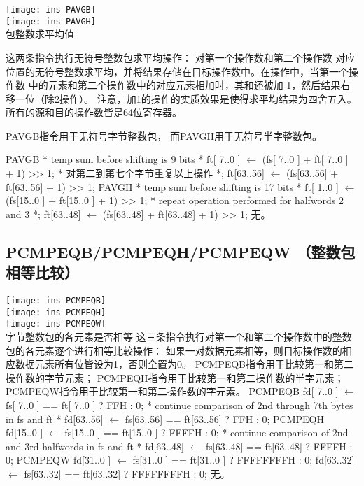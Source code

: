 \begin{instructionblk}
  \texttt{[image: ins-PAVGB]} \\
  \texttt{[image: ins-PAVGH]} \\
  {包整数求平均值}
  {这两条指令执行无符号整数包求平均操作： 对第一个操作数和第二个操作数
  对应位置的无符号整数求平均，并将结果存储在目标操作数中。在操作中，当第一个操作数
  中的元素和第二个操作数中的对应元素相加时，其和还被加 1，然后结果右移一位（除2操作）。
  注意，加1的操作的实质效果是使得求平均结果为四舍五入。
  所有的源和目的操作数皆是64位寄存器。

  PAVGB指令用于无符号字节整数包， 而PAVGH用于无符号半字整数包。}
  {PAVGB \narrownewline
  * temp sum before shifting is 9 bits * \narrownewline
  ft[ 7..0 ] $\leftarrow$ (fs[ 7..0 ] + ft[ 7..0 ] + 1) >> 1; \narrownewline
  * 对第二到第七个字节重复以上操作 *; \narrownewline
  ft[63..56] $\leftarrow$ (fs[63..56] + ft[63..56] + 1) >> 1; \narrownewline \narrownewline
  PAVGH \narrownewline
  * temp sum before shifting is 17 bits * \narrownewline
  ft[ 1..0 ]  $\leftarrow$ (fs[15..0 ] + ft[15..0 ] + 1) >> 1; \narrownewline
  * repeat operation performed for halfwords 2 and 3 *; \narrownewline
  ft[63..48] $\leftarrow$ (fs[63..48] + ft[63..48] + 1) >> 1;}
  {无。}
\end{instructionblk}

\subsection{PCMPEQB/PCMPEQH/PCMPEQW （整数包相等比较）}

\begin{instructionblk}
  \texttt{[image: ins-PCMPEQB]} \\
  \texttt{[image: ins-PCMPEQH]} \\
  \texttt{[image: ins-PCMPEQW]} \\
  {字节整数包的各元素是否相等}
  {这三条指令执行对第一个和第二个操作数中的整数包的各元素逐个进行相等比较操作：
  如果一对数据元素相等，则目标操作数的相应数据元素所有位皆设为1，否则全置为0。
  PCMPEQB指令用于比较第一和第二操作数的字节元素；
  PCMPEQH指令用于比较第一和第二操作数的半字元素；
  PCMPEQW指令用于比较第一和第二操作数的字元素。}
  {PCMPEQB \narrownewline
  fd[ 7..0 ] $\leftarrow$ fs[ 7..0 ] == ft[ 7..0 ] ? FFH : 0; \narrownewline
  * continue comparison of 2nd through 7th bytes in fs and ft * \narrownewline
  fd[63..56] $\leftarrow$ fs[63..56] == ft[63..56] ? FFH : 0; \narrownewline \narrownewline
  PCMPEQH \narrownewline
  fd[15..0 ] $\leftarrow$ fs[15..0 ] == ft[15..0 ] ? FFFFH : 0; \narrownewline
  * continue comparison of 2nd and 3rd halfwords in fs and ft * \narrownewline
  fd[63..48] $\leftarrow$ fs[63..48] == ft[63..48] ? FFFFH : 0; \narrownewline \narrownewline
  PCMPEQW \narrownewline
  fd[31..0 ] $\leftarrow$ fs[31..0 ] == ft[31..0 ] ? FFFFFFFFH : 0; \narrownewline
  fd[63..32] $\leftarrow$ fs[63..32] == ft[63..32] ? FFFFFFFFH : 0;}
  {无。}
\end{instructionblk}

